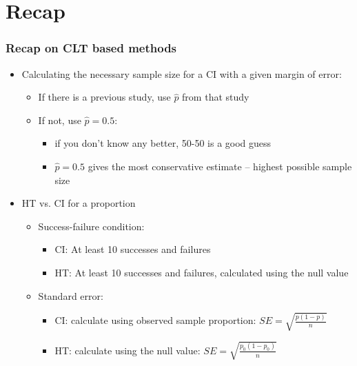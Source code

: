 \documentclass[slidestop,compress,mathserif,12pt,t,professionalfonts,xcolor=table]{beamer}
\begin{document}



\section{Recap}


\begin{frame}
\frametitle{Recap on CLT based methods}

\begin{itemize}

\item Calculating the necessary sample size for a CI with a given margin of error:
\begin{itemize}
\item If there is a previous study, use $\hat{p}$ from that study
\item If not, use $\hat{p} = 0.5$:
\begin{itemize}
\item if you don't know any better, 50-50 is a good guess
\pause
\item $\hat{p} = 0.5$ gives the most conservative estimate -- highest possible sample size
\end{itemize}
\end{itemize}

\item HT vs. CI for a proportion
\begin{itemize}

\item Success-failure condition:
\begin{itemize}
\item CI: At least 10  successes and failures
\item HT: At least 10  successes and failures, calculated using the null value
\end{itemize}

\item Standard error:
\begin{itemize}
\item CI: calculate using observed sample proportion: $SE = \sqrt{\frac{p(1-p)}{n}}$
\item HT: calculate using the null value: $SE = \sqrt{\frac{p_0(1-p_0)}{n}}$
\end{itemize}

\end{itemize}


\end{itemize}

\end{frame}
\end{document}
